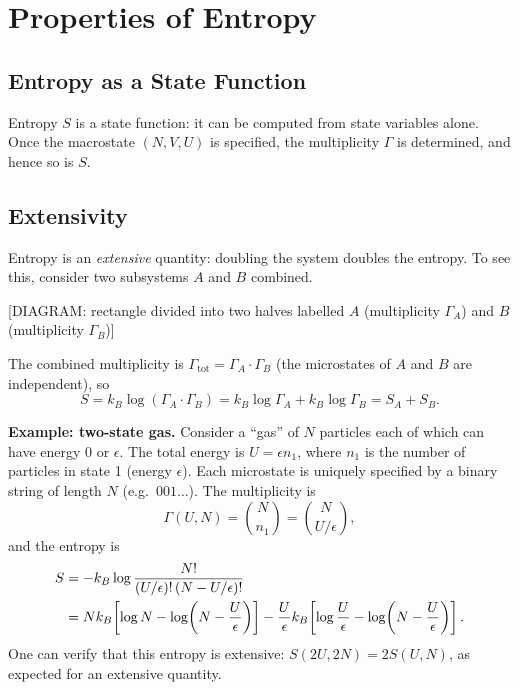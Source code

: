 \section{Properties of Entropy}

\subsection{Entropy as a State Function}

Entropy $S$ is a state function: it can be computed from state variables alone. Once the macrostate $(N, V, U)$ is specified, the multiplicity $\Gamma$ is determined, and hence so is $S$.

\subsection{Extensivity}

Entropy is an \emph{extensive} quantity: doubling the system doubles the entropy. To see this, consider two subsystems $A$ and $B$ combined.

\begin{center}[DIAGRAM: rectangle divided into two halves labelled $A$ (multiplicity $\Gamma_A$) and $B$ (multiplicity $\Gamma_B$)]\end{center}

The combined multiplicity is $\Gamma_{\text{tot}} = \Gamma_A \cdot \Gamma_B$ (the microstates of $A$ and $B$ are independent), so
\begin{equation}
    S = k_B \log(\Gamma_A \cdot \Gamma_B) = k_B\log\Gamma_A + k_B\log\Gamma_B = S_A + S_B.
\end{equation}

\textbf{Example: two-state gas.} Consider a ``gas'' of $N$ particles each of which can have energy $0$ or $\epsilon$. The total energy is $U = \epsilon n_1$, where $n_1$ is the number of particles in state 1 (energy $\epsilon$). Each microstate is uniquely specified by a binary string of length $N$ (e.g.\ $001\ldots$). The multiplicity is
\begin{equation}
    \Gamma(U, N) = \binom{N}{n_1} = \binom{N}{U/\epsilon},
\end{equation}
and the entropy is
\begin{align}
    S &= -k_B\log\frac{N!}{(U/\epsilon)!\,(N - U/\epsilon)!} \notag \\
    &= Nk_B\!\left[\log N - \log\!\left(N - \frac{U}{\epsilon}\right)\right] - \frac{U}{\epsilon}k_B\!\left[\log\frac{U}{\epsilon} - \log\!\left(N - \frac{U}{\epsilon}\right)\right].
\end{align}
One can verify that this entropy is extensive: $S(2U, 2N) = 2S(U, N)$, as expected for an extensive quantity.

